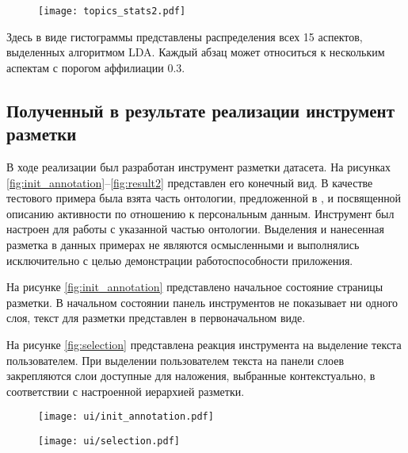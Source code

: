 \documentclass[../main]{subfiles}
\begin{document}
\begin{figure}[H]
    \centering
    {\texttt{[image: topics\_stats2.pdf]}}
    \vspace{-\baselineskip}
\end{figure}

Здесь в виде гистограммы представлены распределения всех 15 аспектов, выделенных алгоритмом LDA. Каждый абзац может относиться к нескольким аспектам с порогом аффилиации 0.3.

\subsection{Полученный в результате реализации инструмент разметки}
\label{sec:real_proto}

В ходе реализации был разработан инструмент разметки датасета. На рисунках \ref{fig:init_annotation}--\ref{fig:result2} представлен его конечный вид. В качестве тестового примера была взята часть онтологии, предложенной в \cite{P2Onto}, и посвященной описанию активности по отношению к персональным данным. Инструмент был настроен для работы с указанной частью онтологии. Выделения и нанесенная разметка в данных примерах не являются осмысленными и выполнялись исключительно с целью демонстрации работоспособности приложения.

На рисунке \ref{fig:init_annotation} представлено начальное состояние страницы разметки. В начальном состоянии панель инструментов не показывает ни одного слоя, текст для разметки представлен в первоначальном виде.

На рисунке \ref{fig:selection} представлена реакция инструмента на выделение текста пользователем. При выделении пользователем текста на панели слоев закрепляются слои доступные для наложения, выбранные контекстуально, в соответствии с настроенной иерархией разметки.
\begin{figure}[H]
    \centering
    {\texttt{[image: ui/init\_annotation.pdf]}}
    \vspace{-\baselineskip}
\end{figure}
\begin{figure}[H]
    \centering
    {\texttt{[image: ui/selection.pdf]}}
    \vspace{-\baselineskip}
\end{figure}
\end{document}
